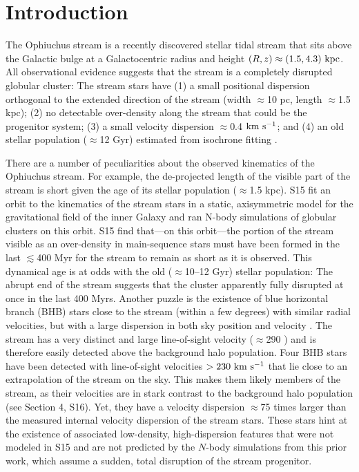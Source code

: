 \section{Introduction}\label{sec:introduction}

The Ophiuchus stream \citep{bernard14, sesar15a} is a recently discovered stellar tidal stream that sits above the Galactic bulge at a Galactocentric radius and height $(R,z) \approx (1.5, 4.3)~{\rm kpc}$. All observational evidence suggests that the stream is a completely disrupted globular cluster: The stream stars have (1) a small positional dispersion orthogonal to the extended direction of the stream (width $\approx$10 pc, length $\approx$1.5 kpc); (2) no detectable over-density along the stream that could be the progenitor system; (3) a small velocity dispersion $\approx$0.4 ${\rm km}~{\rm s}^{-1}$; and (4) an old stellar population ($\approx$12 Gyr) estimated from isochrone fitting \citep[][hereafter S15]{sesar15a}. 

There are a number of peculiarities about the observed kinematics of the Ophiuchus stream. For example, the de-projected length of the visible part of the stream is short given the age of its stellar population ($\approx$1.5 kpc). S15 fit an orbit to the kinematics of the stream stars in a static, axisymmetric model for the gravitational field of the inner Galaxy and ran N-body simulations of globular clusters on this orbit. S15 find that---on this orbit---the portion of the stream visible as an over-density in main-sequence stars must have been formed in the last $\lesssim$400 Myr for the stream to remain as short as it is observed. This dynamical age is at odds with the old ($\approx$10--12 Gyr) stellar population: The abrupt end of the stream suggests that the cluster apparently fully disrupted at once in the last 400 Myrs. Another puzzle is the existence of blue horizontal branch (BHB) stars close to the stream (within a few degrees) with similar radial velocities, but with a large dispersion in both sky position and velocity \citep[][hereafter S16]{sesar16}. The stream has a very distinct and large line-of-sight velocity ($\approx$290 \kms) and is therefore easily detected above the background halo population. Four BHB stars have been detected with line-of-sight velocities $>230~\mathrm{km}~\mathrm{s}^{-1}$ that lie close to an extrapolation of the stream on the sky. This makes them likely members of the stream, as their velocities are in stark contrast to the background halo population (see Section 4, S16). Yet, they have a velocity dispersion $\approx$75 times larger than the measured internal velocity dispersion of the stream stars. These stars hint at the existence of associated low-density, high-dispersion features that were not modeled in S15 and are not predicted by the $N$-body simulations from this prior work, which assume a sudden, total disruption of the stream progenitor.

